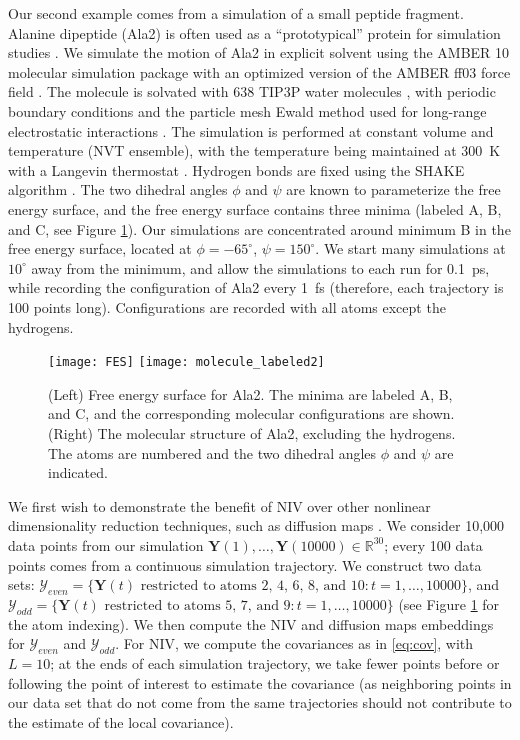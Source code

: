 \documentclass[aip,jcp,preprint]{revtex4-1}
\begin{document}
Our second example comes from a simulation of a small peptide fragment.
%
Alanine dipeptide (Ala2) is often used as a ``prototypical'' protein for simulation studies
\cite{apostolakis1999calculation, bolhuis2000reaction, chekmarev2004long, ma2005automatic, frewen2009exploration, ferguson2011integrating}.
%
We simulate the motion of Ala2 in explicit solvent using the AMBER 10 molecular simulation package \cite{case2008Amber} with an
optimized version \cite{best2009optimized} of the AMBER ff03 force field \cite{duan2003point}.
%
The molecule is solvated with 638 TIP3P water molecules \cite{jorgensen1983comparison}, with periodic boundary conditions and the particle mesh Ewald method used for long-range electrostatic interactions \cite{essmann1995smooth}.
%
The simulation is performed at constant volume and temperature (NVT ensemble), with the temperature being maintained at 300~K with a Langevin thermostat \cite{loncharich1992langevin}.
%
Hydrogen bonds are fixed using the SHAKE algorithm \cite{ryckaert1977numerical}.
%
The two dihedral angles $\phi$ and $\psi$ are known to parameterize the free energy surface, and the free energy surface contains three minima (labeled A, B, and C, see Figure \ref{fig:ala_fes}).
%
Our simulations are concentrated around minimum B in the free energy surface, located at $\phi=-65^{\circ}$, $\psi=150^{\circ}$.
%
We start many simulations at $10^{\circ}$ away from the minimum, and allow the simulations to each run for 0.1~ps, while recording the configuration of Ala2 every 1~fs (therefore, each trajectory is 100 points long).
%
Configurations are recorded with all atoms except the hydrogens.

\begin{figure}[ht]
    \texttt{[image: FES]}
    \texttt{[image: molecule\_labeled2]}
    \caption{(Left) Free energy surface for Ala2. The minima are labeled A, B, and C, and the corresponding molecular configurations are shown. (Right) The molecular structure of Ala2, excluding the hydrogens. The atoms are numbered and the two dihedral angles $\phi$ and $\psi$ are indicated.}
    \label{fig:ala_fes}
\end{figure}


We first wish to demonstrate the benefit of NIV over other nonlinear dimensionality reduction techniques, such as diffusion maps \cite{coifman2005geometric}.
%
We consider 10,000 data points from our simulation $\mathbf{Y}(1), \dots, \mathbf{Y}(10000) \in \mathbb{R}^{30}$; every 100 data points comes from a continuous simulation trajectory.
%
We construct two data sets:
%
$\mathcal{Y}_{even} = \{\mathbf{Y}(t) \text{ restricted to atoms 2, 4, 6, 8, and 10}: t=1, \dots, 10000 \}$,
and $\mathcal{Y}_{odd} = \{\mathbf{Y}(t) \text{ restricted to atoms 5, 7, and 9}: t=1, \dots, 10000 \}$ (see Figure \ref{fig:ala_fes} for the atom indexing).
%
We then compute the NIV and diffusion maps embeddings for $\mathcal{Y}_{even}$ and $\mathcal{Y}_{odd}$.
%
For NIV, we compute the covariances as in \eqref{eq:cov}, with $L=10$;
at the ends of each simulation trajectory, we take fewer points before or following the point of interest to estimate the covariance
(as neighboring points in our data set that do not come from the
same trajectories should not contribute to the estimate of the local covariance).
\end{document}
